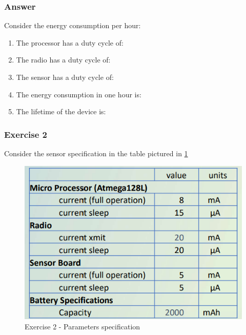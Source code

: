 \documentclass[10pt,a4paper]{report}
\theoremstyle{definition}
\begin{document}
\subsubsection{Answer}\label{sec:answer}
Consider the energy consumption per hour:
\begin{enumerate}
	\item The processor has a duty cycle of:

	\item The radio has a duty cycle of:
	\item The sensor has a duty cycle of:
	\item The energy consumption in one hour is:
	\item The lifetime of the device is: 
\end{enumerate}



\subsubsection{Exercise 2}\label{sec:exercise-2}
Consider the sensor specification in the table pictured in \ref{energy-ex2}
\begin{figure}
	\centering\includegraphics[scale=0.50]{images/Pasted image 20230328161140.png}
	\caption{Exercise 2 - Parameters specification}
\label{energy-ex2}
\end{figure}
\end{document}
